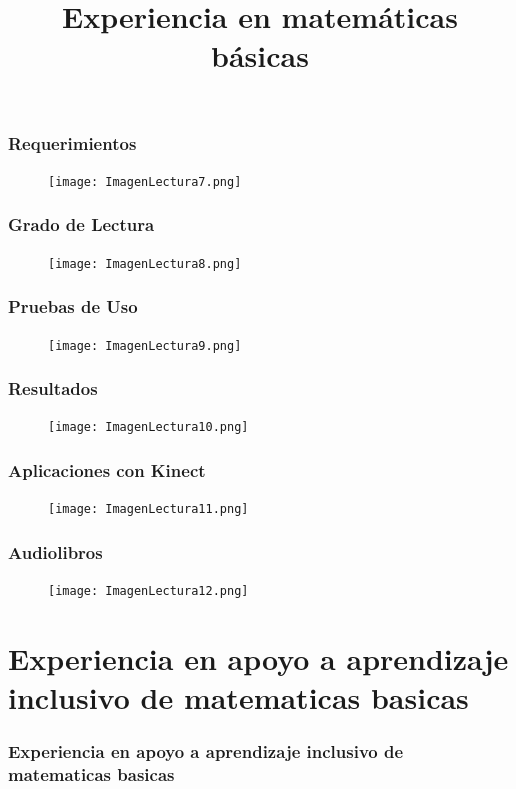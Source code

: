\documentclass[11pt]{beamer}
\begin{document}
\begin{frame}
\frametitle{Requerimientos}
    \begin{figure}
    \centering
     \texttt{[image: ImagenLectura7.png]}
    \end{figure}
\end{frame}

\begin{frame}
\frametitle{Grado de Lectura}
    \begin{figure}
    \centering
     \texttt{[image: ImagenLectura8.png]}
    \end{figure}
\end{frame}

\begin{frame}
\frametitle{Pruebas de Uso}
    \begin{figure}
    \centering
     \texttt{[image: ImagenLectura9.png]}
    \end{figure}
\end{frame}

\begin{frame}
\frametitle{Resultados}
    \begin{figure}
    \centering
     \texttt{[image: ImagenLectura10.png]}
    \end{figure}
\end{frame}

\begin{frame}
\frametitle{Aplicaciones con Kinect}
    \begin{figure}
    \centering
     \texttt{[image: ImagenLectura11.png]}
    \end{figure}
\end{frame}

\begin{frame}
\frametitle{Audiolibros}
    \begin{figure}
    \centering
     \texttt{[image: ImagenLectura12.png]}
    \end{figure}
\end{frame}

\section{Experiencia en apoyo a aprendizaje inclusivo de matematicas basicas}
\title{Experiencia en matemáticas básicas}
\begin{frame}
\frametitle{Experiencia en apoyo a aprendizaje inclusivo de matematicas basicas}
\end{frame}
\end{document}
